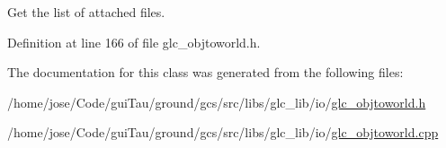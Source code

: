 Get the list of attached files. 



Definition at line 166 of file glc\-\_\-objtoworld.\-h.



The documentation for this class was generated from the following files\-:\begin{DoxyCompactItemize}
\item 
/home/jose/\-Code/gui\-Tau/ground/gcs/src/libs/glc\-\_\-lib/io/\hyperlink{glc__objtoworld_8h}{glc\-\_\-objtoworld.\-h}\item 
/home/jose/\-Code/gui\-Tau/ground/gcs/src/libs/glc\-\_\-lib/io/\hyperlink{glc__objtoworld_8cpp}{glc\-\_\-objtoworld.\-cpp}\end{DoxyCompactItemize}

